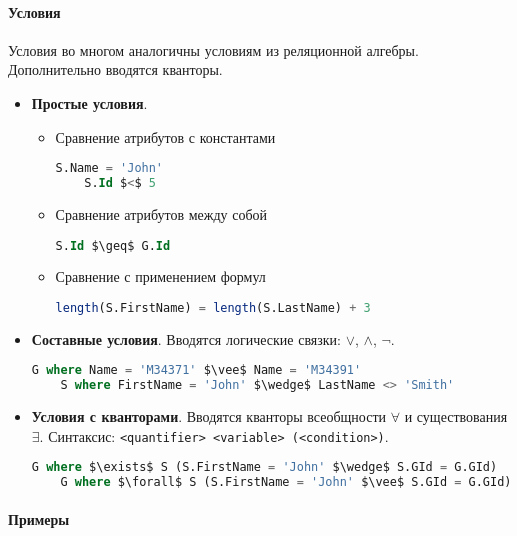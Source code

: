 \paragraph{Условия}

Условия во многом аналогичны условиям из реляционной алгебры. Дополнительно вводятся кванторы.

\begin{itemize}
	\item \textbf{Простые условия}.
	      \begin{itemize}
		      \item Сравнение атрибутов с константами
		            \begin{lstlisting}[language=SQL, mathescape=true]
    S.Name = 'John'
    S.Id $<$ 5
                \end{lstlisting}
		      \item Сравнение атрибутов между собой
		            \begin{lstlisting}[language=SQL, mathescape=true]
    S.Id $\geq$ G.Id
                \end{lstlisting}
		      \item Сравнение с применением формул
		            \begin{lstlisting}[language=SQL, mathescape=true]
    length(S.FirstName) = length(S.LastName) + 3
                \end{lstlisting}
	      \end{itemize}
	\item \textbf{Составные условия}. Вводятся логические связки: $\vee$, $\wedge$,
	      $\neg$.
	      \begin{lstlisting}[language=SQL, mathescape=true]
    G where Name = 'M34371' $\vee$ Name = 'M34391'
    S where FirstName = 'John' $\wedge$ LastName <> 'Smith'
        \end{lstlisting}
	\item \textbf{Условия с кванторами}. Вводятся кванторы всеобщности $\forall$ и существования
	      $\exists$. Синтаксис: \texttt{<quantifier> <variable> (<condition>)}.
	      \begin{lstlisting}[language=SQL, mathescape=true]
    G where $\exists$ S (S.FirstName = 'John' $\wedge$ S.GId = G.GId)
    G where $\forall$ S (S.FirstName = 'John' $\vee$ S.GId = G.GId)
        \end{lstlisting}
\end{itemize}

\paragraph{Примеры}

